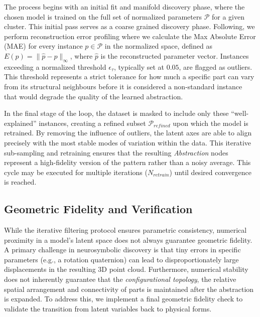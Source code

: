 \documentclass{thesis}
\begin{document}
The process begins with an initial fit and manifold discovery phase, where the chosen model is trained on the full set of normalized parameters $\mathcal{P}$ for a given cluster. This initial pass serves as a coarse grained discovery phase. Following, we perform reconstruction error profiling where we calculate the Max Absolute Error (MAE) for every instance $p \in \mathcal{P}$ in the normalized space, defined as $E(p) = \| \hat{p} - p \|_{\infty}$, where $\hat{p}$ is the reconstructed parameter vector. Instances exceeding a normalized threshold $\epsilon_{\tau}$, typically set at $0.05$, are flagged as outliers. This threshold represents a strict tolerance for how much a specific part can vary from its structural neighbours before it is considered a non-standard instance that would degrade the quality of the learned abstraction.

In the final stage of the loop, the dataset is masked to include only these ``well-explained'' instances, creating a refined subset $\mathcal{P}_{refined}$ upon which the model is retrained. By removing the influence of outliers, the latent axes are able to align precisely with the most stable modes of variation within the data. This iterative sub-sampling and retraining ensures that the resulting \textit{Abstraction} nodes represent a high-fidelity version of the pattern rather than a noisy average. This cycle may be executed for multiple iterations ($N_{retrain}$) until desired convergence is reached.

\subsection{Geometric Fidelity and Verification}

While the iterative filtering protocol ensures parametric consistency, numerical proximity in a model's latent space does not always guarantee geometric fidelity. A primary challenge in neurosymbolic discovery is that tiny errors in specific parameters (e.g., a rotation quaternion) can lead to disproportionately large displacements in the resulting 3D point cloud. Furthermore, numerical stability does not inherently guarantee that the \textit{configurational topology}, the relative spatial arrangement and connectivity of parts is maintained after the abstraction is expanded. To address this, we implement a final geometric fidelity check to validate the transition from latent variables back to physical forms.
\end{document}
